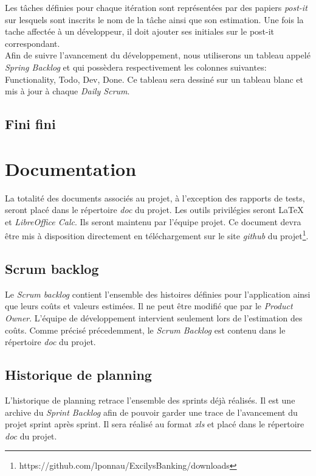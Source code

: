 \documentclass[11pt]{article}
\begin{document}
Les tâches définies pour chaque itération sont représentées par des papiers
\emph{post-it} sur lesquels sont inscrits le nom de la tâche ainsi que son
estimation. Une fois la tache affectée à un développeur, 
il doit ajouter ses initiales sur le post-it correspondant.\\

Afin de suivre l'avancement du développement, nous utiliserons un tableau appelé \emph{Spring Backlog} et qui possèdera respectivement les colonnes suivantes: Functionality, Todo, Dev, Done. Ce tableau sera dessiné sur un tableau blanc et mis à jour à chaque \emph{Daily Scrum}.

\subsection{Fini fini}



\section{Documentation}

La totalité des documents associés au projet, à l'exception des rapports de tests, seront placé dans le répertoire \emph{doc} du projet. Les outils privilégies seront \LaTeX{} et \emph{LibreOffice Calc}. Ils seront maintenu par l'équipe projet. Ce document devra être mis à disposition directement en téléchargement sur le site \emph{github} du projet\footnote{https://github.com/lponnau/ExcilysBanking/downloads}.

\subsection{Scrum backlog}

Le \emph{Scrum backlog} contient l'ensemble des histoires définies pour
l'application ainsi que leurs coûts et valeurs estimées. Il ne peut être modifié
que par le \emph{Product Owner}. L'équipe de développement intervient seulement
lors de l'estimation des coûts. Comme précisé précedemment, le \emph{Scrum Backlog} est contenu dans le répertoire \emph{doc} du projet.

\subsection{Historique de planning}

L'historique de planning retrace l'ensemble des sprints déjà réalisés. Il est une archive du \emph{Sprint Backlog} afin de pouvoir garder une trace de l'avancement du projet sprint après sprint. Il sera réalisé au format \emph{xls} et placé dans le répertoire \emph{doc} du projet.
\end{document}
